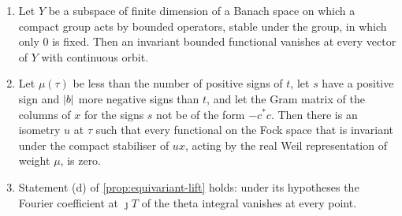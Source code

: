 \begin{lemma}\label{lem:no-invariant}
\begin{enumerate}[label=\textup{(\alph*)}]
\item Let $Y$ be a subspace of finite dimension of a Banach space on which a compact group acts by bounded operators, stable under the group, in which only $0$ is fixed. Then an invariant bounded
functional vanishes at every vector of $Y$ with continuous orbit.
\item Let $\mu(\tau)$ be less than the number of positive signs of $t$, let $s$ have a positive sign and $\lvert b\rvert$ more negative signs than $t$, and let the Gram matrix of the columns of $x$ for the signs $s$
not be of the form $-c^*c$. Then there is an isometry $u$ at $\tau$ such that every functional on the Fock space that is invariant under the compact stabiliser of $ux$, acting by the real Weil representation of
weight $\mu$, is zero.
\item Statement \textup{(d)} of \cref{prop:equivariant-lift} holds: under its hypotheses the Fourier coefficient at $\jmath T$ of the theta integral vanishes at every point.
\end{enumerate}
\end{lemma}

